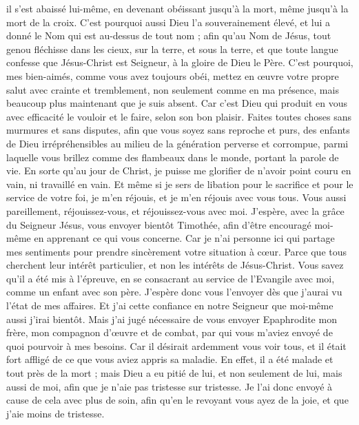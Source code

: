 \begin{multicols}{2}
il s'est abaissé lui-même, en devenant obéissant jusqu’à la mort, même jusqu’à la mort de la croix.
C'est pourquoi aussi Dieu l'a souverainement élevé, et lui a donné le Nom qui est au-dessus de tout nom ;
afin qu'au Nom de Jésus, tout genou fléchisse dans les cieux, sur la terre, et sous la terre,
et que toute langue confesse que Jésus-Christ est Seigneur, à la gloire de Dieu le Père.
C'est pourquoi, mes bien-aimés, comme vous avez toujours obéi, mettez en œuvre votre propre salut avec crainte et tremblement, non seulement comme en ma présence, mais beaucoup plus maintenant que je suis absent.
Car c'est Dieu qui produit en vous avec efficacité le vouloir et le faire, selon son bon plaisir.
Faites toutes choses sans murmures et sans disputes,
afin que vous soyez sans reproche et purs, des enfants de Dieu irrépréhensibles au milieu de la génération perverse et corrompue, parmi laquelle vous brillez comme des flambeaux dans le monde, portant la parole de vie.
En sorte qu’au jour de Christ, je puisse me glorifier de n'avoir point couru en vain, ni travaillé en vain.
Et même si je sers de libation pour le sacrifice et pour le service de votre foi, je m’en réjouis, et je m'en réjouis avec vous tous.
Vous aussi pareillement, réjouissez-vous, et réjouissez-vous avec moi.
J'espère, avec la grâce du Seigneur Jésus, vous envoyer bientôt Timothée, afin d’être encouragé moi-même en apprenant ce qui vous concerne.
Car je n'ai personne ici qui partage mes sentiments pour prendre sincèrement votre situation à cœur.
Parce que tous cherchent leur intérêt particulier, et non les intérêts de Jésus-Christ.
Vous savez qu’il a été mis à l’épreuve, en se consacrant au service de l’Evangile avec moi, comme un enfant avec son père.
J'espère donc vous l'envoyer dès que j'aurai vu l’état de mes affaires.
Et j’ai cette confiance en notre Seigneur que moi-même aussi j’irai bientôt.
Mais j'ai jugé nécessaire de vous envoyer Epaphrodite mon frère, mon compagnon d’œuvre et de combat, par qui vous m’aviez envoyé de quoi pourvoir à mes besoins.
Car il désirait ardemment vous voir tous, et il était fort affligé de ce que vous aviez appris sa maladie.
En effet, il a été malade et tout près de la mort ; mais Dieu a eu pitié de lui, et non seulement de lui, mais aussi de moi, afin que je n’aie pas tristesse sur tristesse.
Je l'ai donc envoyé à cause de cela avec plus de soin, afin qu'en le revoyant vous ayez de la joie, et que j'aie moins de tristesse.

\end{multicols}
